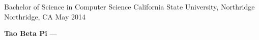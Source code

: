 
\begin{cventries}
  \cventry
    {Bachelor of Science in Computer Science} %
    {California State University, Northridge} %
    {Northridge, CA} %
    {May 2014} %
    {
      \begin{cvitems} %
         \item {\textbf{Tao Beta Pi}  --- }
         \vspace{0.5mm}
      \end{cvitems}
    }
\end{cventries}
